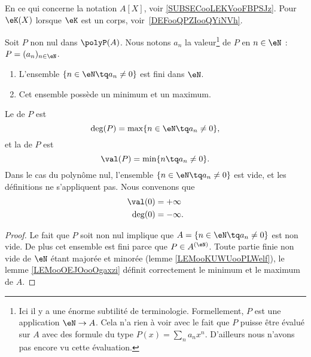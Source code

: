 \begin{normaltext}
	En ce qui concerne la notation \( A[X]\), voir \ref{SUBSECooLEKVooFBPSJz}. Pour \( \eK(X)\) lorsque \( \eK\) est un corps, voir~\ref{DEFooQPZIooQYiNVh}.
\end{normaltext}

\begin{propositionDef}  \label{DefDegrePoly}
	Soit \( P\) non nul dans \(\polyP(A)\). Nous notons \( a_n\) la valeur\footnote{Ici il y a une énorme subtilité de terminologie. Formellement, \( P\) est une application \( \eN\to A\). Cela n'a rien à voir avec le fait que \( P\) puisse être évalué sur \( A\) avec des formule du type \( P(x)=\sum_na_nx^n\). D'ailleurs nous n'avons pas encore vu cette évaluation.} de \( P\) en \( n\in \eN\) : \( P=(a_n)_{n\in \eN}\).
	\begin{enumerate}
		\item
		      L'ensemble \( \{ n\in \eN\tq a_n\neq 0 \}\) est fini dans \( \eN\).
		\item
		      Cet ensemble possède un minimum et un maximum.
	\end{enumerate}
	Le  de \( P\) est
	\begin{equation}
		\deg(P)=\max\{ n\in \eN\tq a_n\neq 0 \},
	\end{equation}
	et la  de \( P\) est
	\begin{equation}
		\val(P)=\min\{ n\tq a_n\neq 0 \}.
	\end{equation}
	Dans le cas du polynôme nul, l'ensemble \( \{ n\in \eN\tq a_n\neq 0 \}\) est vide, et les définitions ne s'appliquent pas. Nous convenons que
	\begin{subequations}
		\begin{align}
			\val(0) & =+\infty  \\
			\deg(0) & =-\infty.
		\end{align}
	\end{subequations}
\end{propositionDef}

\begin{proof}
	Le fait que \( P\) soit non nul implique que \( A=\{ n\in \eN\tq a_n\neq 0 \}\) est non vide. De plus cet ensemble est fini parce que \( P\in A^{(\eN)}\). Toute partie finie non vide de \( \eN\) étant majorée et minorée (lemme \ref{LEMooKUWUooPLWelf}), le lemme \ref{LEMooOEJOooOgaxzi} définit correctement le minimum et le maximum de \( A\).
\end{proof}

